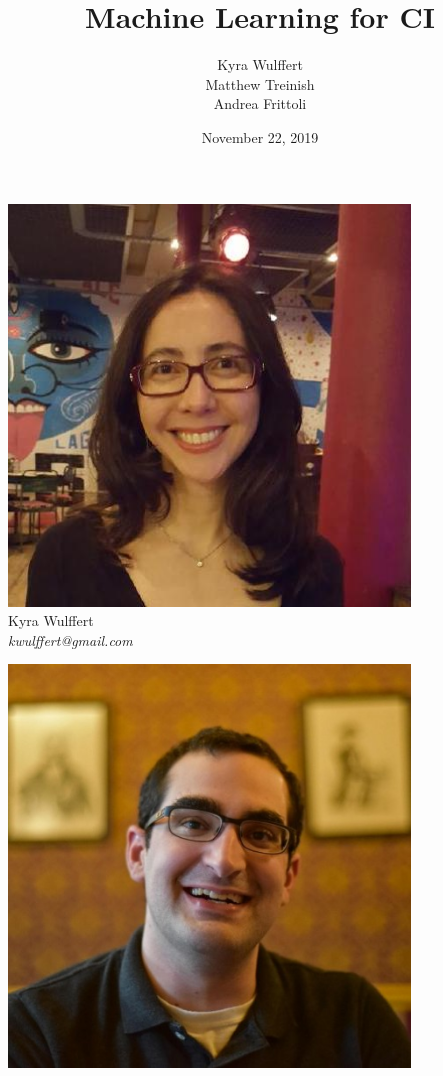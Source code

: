 \documentclass[aspectratio=169,11pt,hyperref={colorlinks=true}]{beamer}
\author[Kyra Matt Andrea]{%
\LARGE Kyra Wulffert \\
\LARGE Matthew Treinish \\
\LARGE Andrea Frittoli \\
}
\date{November 22, 2019}
\title{Machine Learning for CI}
\institute[ODSC]{%
Open Data Science Conference \\
London 2019
}
\begin{document}
\begin{frame}[noframenumbering]
\titlepage{}
\end{frame}

\begin{3columnsframe}
  {
  \begin{centering}
    \includegraphics[width=0.8\textwidth]{img/kw.jpg} \\
    Kyra Wulffert \\
    \em{kwulffert@gmail.com} \\
  \end{centering}
  }
  {
  \begin{centering}
    \includegraphics[width=0.8\textwidth]{img/mt.jpg} \\

\end{centering}}
\end{3columnsframe}
\end{document}
